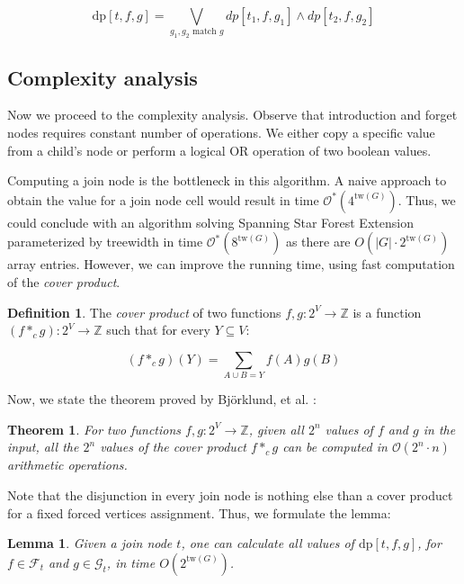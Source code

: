 \documentclass[en]{pracamgr}
\newtheorem{theorem}{Theorem}
\newtheorem{lemma}{Lemma}
\theoremstyle{definition}
\newtheorem{definition}{Definition}
\newcommand{\ssfep}{{\sc Spanning Star Forest Extension}}
\newcommand{\dpt}[1]{\textrm{dp}[#1]}
\newcommand{\tw}{\textrm{tw}}
\begin{document}
\begin{equation*}
	\dpt{t,f,g} =
		\bigvee\limits_{g_1,g_2 \text{ match $g$}} dp[t_1,f,g_1] \land dp[t_2,f,g_2]
\end{equation*}

\subsection{Complexity analysis}

Now we proceed to the complexity analysis. Observe that introduction and forget nodes requires constant number of operations. We either copy a specific value from a child's node or perform a logical OR operation of two boolean values. 

Computing a join node is the bottleneck in this algorithm. A naive approach to obtain the value for a join node cell would result in time $\mathcal{O}^*(4^{\tw(G)})$. Thus, we could conclude with an algorithm solving \ssfep{} parameterized by treewidth in time $\mathcal{O}^*(8^{\tw(G)})$ as there are $O(|G| \cdot 2^{\tw(G)})$ array entries. However, we can improve the running time, using fast computation of the \textit{cover product}.

\begin{definition}
	The \textit{cover product} of two functions $f,g:2^V \rightarrow \mathbb{Z}$ is a function $(f *_c g):2^V \rightarrow \mathbb{Z}$ such that for every $Y \subseteq V$:
	
	\begin{equation*}
		(f *_c g)(Y) = \sum\limits_{ A \cup B = Y} f(A)g(B)
	\end{equation*}
\end{definition}

Now, we state the theorem proved by Björklund, et al. \cite{Cover product}:

\begin{theorem}\label{cproduct}
	For two functions $f,g:2^V \rightarrow \mathbb{Z}$, given all $2^n$ values of $f$ and $g$ in the input, all the $2^n$ values of the cover product $f*_cg$ can be computed in $\mathcal{O}(2^n\cdot n)$ arithmetic operations.
\end{theorem}

Note that the disjunction in every join node is nothing else than a cover product for a fixed forced vertices assignment. Thus, we formulate the lemma:

\begin{lemma}\label{join lemma}
	Given a join node $t$, one can calculate all values of $\dpt{t,f,g}$, for $f \in \mathcal{F}_t$ and $g \in \mathcal{G}_t$, in time $O(2^{\tw(G)})$.
\end{lemma}
\end{document}
